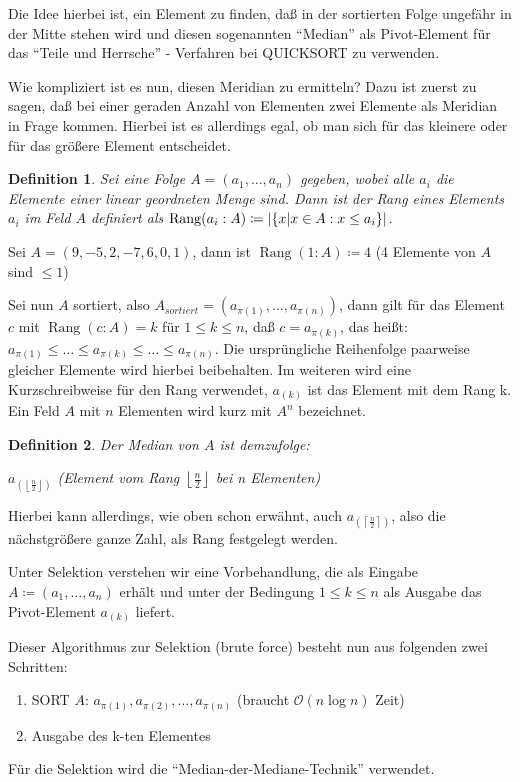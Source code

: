 \documentclass[ngerman,draft,parskip=half*,twoside]{scrreprt}
\theoremstyle{break}
\newtheorem{definition}{Definition}[chapter]
\theoremstyle{nonumberbreak}
\newcommand*{\OO}{\mathcal{O}}      %
\DeclareMathOperator{\rg}{Rang}     %
\DeclarePairedDelimiter{\abs}{\lvert}{\rvert}
\begin{document}
 Die Idee hierbei ist, ein Element zu finden, daß in der sortierten Folge ungefähr in der Mitte stehen wird und diesen sogenannten
 "`Median"' als Pivot-Element für das "`Teile und Herrsche"' - Verfahren bei \textsc{QUICKSORT} zu verwenden.

 Wie kompliziert ist es nun, diesen Meridian zu ermitteln? Dazu ist zuerst zu sagen, daß bei einer geraden Anzahl von Elementen zwei
 Elemente als Meridian in Frage kommen. Hierbei ist es allerdings egal, ob man sich für das kleinere oder für das größere Element
 entscheidet.

\begin{definition}
 Sei eine Folge $A=(a_{1}, \ldots , a_{n})$ gegeben, wobei alle $a_{i}$ die Elemente einer linear geordneten Menge sind. 
 Dann ist der Rang eines Elements $a_i$ im Feld $A$ definiert als $\rg(a_{i}:A)\coloneqq \abs{\left\{x|x \in A:x\leq a_{i}\right\}}$.
\end{definition}

 Sei $A=(9,-5,2,-7,6,0,1)$, dann ist $\rg(1:A)\coloneqq 4$ (4 Elemente von $A$ sind $\leq 1$)


Sei nun $A$ sortiert, also $A_{sortiert}=(a_{\pi(1)}, \ldots , a_{\pi(n)})$, dann gilt für das Element $c$ mit $\rg(c:A)=k$ für $1\leq k
\leq n$, daß $c=a_{\pi(k)}$, das heißt:
$a_{\pi(1)}\leq \ldots \leq a_{\pi(k)}\leq \ldots \leq a_{\pi(n)}$.
Die ursprüngliche Reihenfolge paarweise gleicher Elemente wird hierbei beibehalten. Im weiteren wird
eine Kurzschreibweise für den Rang verwendet, $a_{(k)}$ ist das Element mit dem Rang k. Ein Feld $A$ mit $n$ Elementen wird kurz mit $A^n$
bezeichnet.

\begin{definition}
Der Median von $A$ ist demzufolge:

$a_{\left(\left\lfloor \frac{n}{2}\right\rfloor\right)}$ (Element vom Rang $\left\lfloor \frac{n}{2}\right\rfloor$ bei n Elementen)
\end{definition}

Hierbei kann allerdings, wie oben schon erwähnt, auch $a_{\left(\left\lceil \frac{n}{2}\right\rceil\right)}$, also die nächstgrößere
ganze Zahl, als Rang festgelegt werden.

Unter Selektion verstehen wir eine Vorbehandlung, die als Eingabe 
$A\coloneqq (a_{1}, \ldots , a_{n})$ erhält und unter der Bedingung $1\leq k\leq n$ als Ausgabe das Pivot-Element $a_{(k)}$ liefert.

 Dieser Algorithmus zur Selektion (brute force) besteht nun aus folgenden zwei Schritten:
 \begin{enumerate}
	\item SORT $A$: $a_{\pi(1)}, a_{\pi(2)}, \ldots , a_{\pi(n)}$ (braucht $\OO(n \log n)$ Zeit)
	\item Ausgabe des k-ten Elementes
 \end{enumerate}
 Für die Selektion wird die "`Median-der-Mediane-Technik"' verwendet. 
\end{document}
